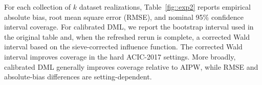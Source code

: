 \documentclass[11pt]{article}
\theoremstyle{plain}
\begin{document}

 
 

For each collection of $k$ dataset realizations, Table~\ref{fig::exp2} reports empirical absolute bias, root mean square error (RMSE), and nominal 95\% confidence interval coverage. For calibrated DML, we report the bootstrap interval used in the original table and, when the refreshed rerun is complete, a corrected Wald interval based on the sieve-corrected influence function. The corrected Wald interval improves coverage in the hard ACIC-2017 settings. More broadly, calibrated DML generally improves coverage relative to AIPW, while RMSE and absolute-bias differences are setting-dependent.
\end{document}
